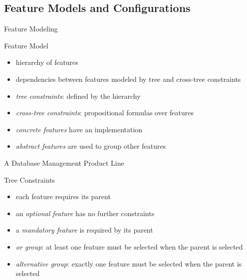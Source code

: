 \subsection{Feature Models and Configurations}
\begin{frame}{Feature Modeling\ \mytitlesource{\fospl}}
	\begin{fancycolumns}
		\begin{definition}{Feature Model}	%
			\begin{itemize}
				\item hierarchy of features
				\item dependencies between features modeled by tree and cross-tree constraints
				\item \emph{tree constraints}: defined by the hierarchy
				\item \emph{cross-tree constraints}: propositional formulas over features
				\item \emph{concrete features} have an implementation
				\item \emph{abstract features} are used to group other features
			\end{itemize}
		\end{definition}
		\nextcolumn
		\vspace{-12mm}
		\begin{exampletight}{A Database Management Product Line}
			\centering{}
		\end{exampletight}
		\begin{definition}{Tree Constraints}
			\begin{itemize}
				\item each feature requires its parent
				\item an \emph{optional feature} has no further constraints %
				\item a \emph{mandatory feature} is required by its parent
				\item \emph{or group}: at least one feature must be selected when the parent is selected
				\item \emph{alternative group}: exactly one feature must be selected when the parent is selected
			\end{itemize}
		\end{definition}
	\end{fancycolumns}
\end{frame}

